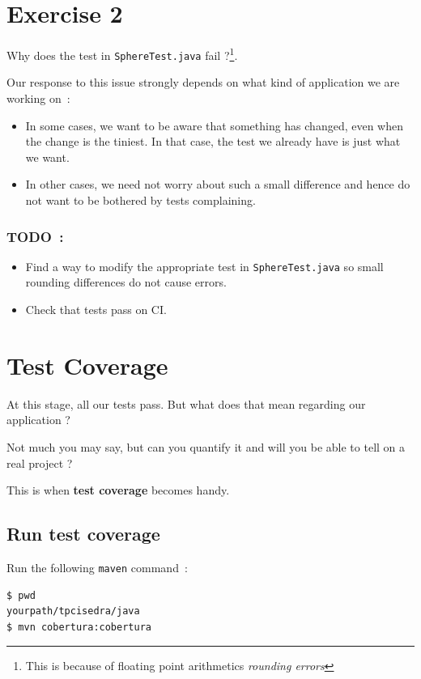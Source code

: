 \documentclass{article}
\begin{document}
\section{Exercise 2}

Why does the test in \texttt{SphereTest.java} fail ?\footnote{This is because of floating point arithmetics \emph{rounding errors}}.

Our response to this issue strongly depends on what kind of application we are working on~:
\begin{itemize}
\item In some cases, we want to be aware that something has changed, even when the change is the tiniest. In that case, the test we already have is just what we want.
\item In other cases, we need not worry about such a small difference and hence do not want to be bothered by tests complaining.
\end{itemize}

\subsubsection{TODO~:}
\begin{itemize}
\item Find a way to modify the appropriate test in \texttt{SphereTest.java}
so small rounding differences do not cause errors.
\item Check that tests pass on CI.
\end{itemize}


\section{Test Coverage}

At this stage, all our tests pass. But what does that mean regarding our application ?

Not much you may say, but can you quantify it and will you be able to tell on a real project ?

This is when \textbf{test coverage} becomes handy.

\subsection{Run test coverage}

Run the following \texttt{maven} command~:
\begin{lstlisting}
$ pwd
yourpath/tpcisedra/java
$ mvn cobertura:cobertura
\end{lstlisting}
\end{document}
